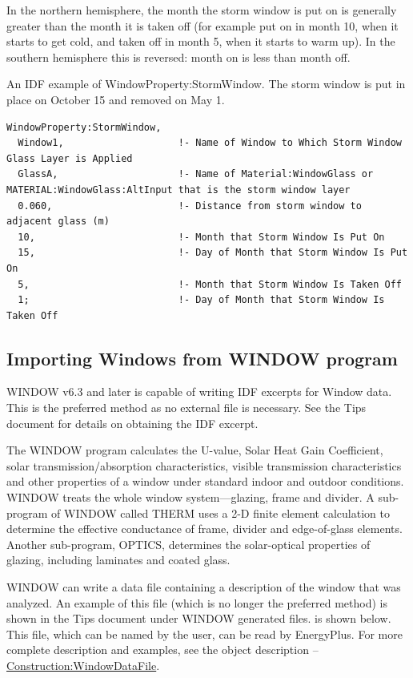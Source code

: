 In the northern hemisphere, the month the storm window is put on is generally greater than the month it is taken off (for example put on in month 10, when it starts to get cold, and taken off in month 5, when it starts to warm up). In the southern hemisphere this is reversed: month on is less than month off.

An IDF example of WindowProperty:StormWindow. The storm window is put in place on October 15 and removed on May 1.

\begin{lstlisting}
WindowProperty:StormWindow,
  Window1,                    !- Name of Window to Which Storm Window Glass Layer is Applied
  GlassA,                     !- Name of Material:WindowGlass or MATERIAL:WindowGlass:AltInput that is the storm window layer
  0.060,                      !- Distance from storm window to adjacent glass (m)
  10,                         !- Month that Storm Window Is Put On
  15,                         !- Day of Month that Storm Window Is Put On
  5,                          !- Month that Storm Window Is Taken Off
  1;                          !- Day of Month that Storm Window Is Taken Off
\end{lstlisting}

\subsection{Importing Windows from WINDOW program}\label{importing-windows-from-window-program}

\begin{callout}
WINDOW v6.3 and later is capable of writing IDF excerpts for Window data. This is the preferred method as no external file is necessary. See the Tips document for details on obtaining the IDF excerpt.
\end{callout}

The WINDOW program calculates the U-value, Solar Heat Gain Coefficient, solar transmission/absorption characteristics, visible transmission characteristics and other properties of a window under standard indoor and outdoor conditions. WINDOW treats the whole window system---glazing, frame and divider. A sub-program of WINDOW called THERM uses a 2-D finite element calculation to determine the effective conductance of frame, divider and edge-of-glass elements. Another sub-program, OPTICS, determines the solar-optical properties of glazing, including laminates and coated glass.

WINDOW can write a data file containing a description of the window that was analyzed. An example of this file (which is no longer the preferred method) is shown in the Tips document under WINDOW generated files. is shown below. This file, which can be named by the user, can be read by EnergyPlus. For more complete description and examples, see the object description -- \hyperref[constructionwindowdatafile]{Construction:WindowDataFile}.

